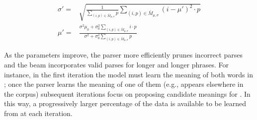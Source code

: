\begin{align}
	\sigma' =& \sqrt{
		\frac{ 1 } { \sum\limits_{(i,p) \in \bar M_{\mu,\sigma}}  p }
		\sum\limits_{(i,p) \in \bar M_{\mu,\sigma}} (i-\mu')^2 \cdot p
	} \\
	\mu' =&
		\frac{
			\sigma^2 \mu_0 + \sigma_0^2 \sum_{(i,p) \in \bar M_{\mu,\sigma}}  i \cdot p
		}{
			\sigma^2 + \sigma_0^2 \sum_{(i,p) \in \bar M_{\mu,\sigma}} p 
		}
\label{eqn:gaussianEM}
\end{align}

As the parameters improve, the parser more efficiently prunes incorrect parses
	and the beam incorporates valid parses for longer and longer phrases.
For instance, in the first iteration the model must learn the meaning of both
	words in ; once the parser learns the meaning of one of them
	(e.g.,  appears elsewhere in the corpus) subsequent iterations
	focus on proposing candidate meanings for .
In this way, a progressively larger percentage of the data is available to be
	learned from at each iteration.

%
%

